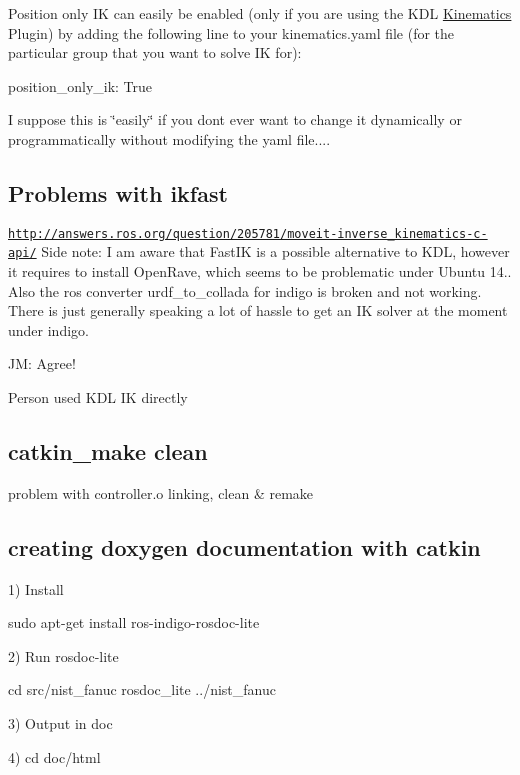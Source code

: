 Position only I\-K can easily be enabled (only if you are using the K\-D\-L \hyperlink{classKinematics}{Kinematics} Plugin) by adding the following line to your kinematics.\-yaml file (for the particular group that you want to solve I\-K for)\-:

position\-\_\-only\-\_\-ik\-: True

I suppose this is \char`\"{}easily\char`\"{} if you dont ever want to change it dynamically or programmatically without modifying the yaml file....

\subsection*{Problems with ikfast }

\href{http://answers.ros.org/question/205781/moveit-inverse_kinematics-c-api/}{\tt http\-://answers.\-ros.\-org/question/205781/moveit-\/inverse\-\_\-kinematics-\/c-\/api/} Side note\-: I am aware that Fast\-I\-K is a possible alternative to K\-D\-L, however it requires to install Open\-Rave, which seems to be problematic under Ubuntu 14.. Also the ros converter urdf\-\_\-to\-\_\-collada for indigo is broken and not working. There is just generally speaking a lot of hassle to get an I\-K solver at the moment under indigo.

J\-M\-: Agree!

Person used K\-D\-L I\-K directly

\subsection*{catkin\-\_\-make clean }

problem with controller.\-o linking, clean \& remake

\subsection*{creating doxygen documentation with catkin }

1) Install \begin{DoxyVerb}sudo apt-get install ros-indigo-rosdoc-lite 
\end{DoxyVerb}


2) Run rosdoc-\/lite \begin{DoxyVerb}cd src/nist_fanuc
rosdoc_lite ../nist_fanuc
\end{DoxyVerb}


3) Output in doc

4) cd doc/html

